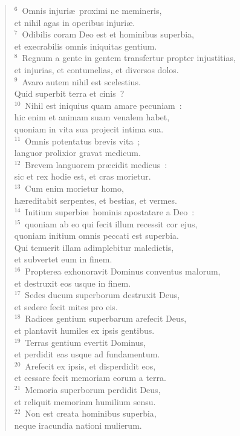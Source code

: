 \begin{flushleft}\begin{verse}${}^{6}$~Omnis injuri\ae\ proximi ne memineris,\\ et nihil agas in operibus injuri\ae .\\
${}^{7}$~Odibilis coram Deo est et hominibus superbia,\\ et execrabilis omnis iniquitas gentium.\\
${}^{8}$~Regnum a gente in gentem transfertur propter injustitias,\\ et injurias, et contumelias, et diversos dolos.\\
${}^{9}$~Avaro autem nihil est scelestius.\\ Quid superbit terra et cinis~?\\
${}^{10}$~Nihil est iniquius quam amare pecuniam~:\\ hic enim et animam suam venalem habet,\\ quoniam in vita sua projecit intima sua.\\
${}^{11}$~Omnis potentatus brevis vita~;\\ languor prolixior gravat medicum.\\
${}^{12}$~Brevem languorem pr\ae cidit medicus~:\\ sic et rex hodie est, et cras morietur.\\
${}^{13}$~Cum enim morietur homo,\\ h\ae reditabit serpentes, et bestias, et vermes.\\
${}^{14}$~Initium superbi\ae\ hominis apostatare a Deo~:\\
${}^{15}$~quoniam ab eo qui fecit illum recessit cor ejus,\\ quoniam initium omnis peccati est superbia.\\ Qui tenuerit illam adimplebitur maledictis,\\ et subvertet eum in finem.\\
${}^{16}$~Propterea exhonoravit Dominus conventus malorum,\\ et destruxit eos usque in finem.\\
${}^{17}$~Sedes ducum superborum destruxit Deus,\\ et sedere fecit mites pro eis.\\
${}^{18}$~Radices gentium superbarum arefecit Deus,\\ et plantavit humiles ex ipsis gentibus.\\
${}^{19}$~Terras gentium evertit Dominus,\\ et perdidit eas usque ad fundamentum.\\
${}^{20}$~Arefecit ex ipsis, et disperdidit eos,\\ et cessare fecit memoriam eorum a terra.\\
${}^{21}$~Memoria superborum perdidit Deus,\\ et reliquit memoriam humilium sensu.\\
${}^{22}$~Non est creata hominibus superbia,\\ neque iracundia nationi mulierum.\end{verse}\end{flushleft}


